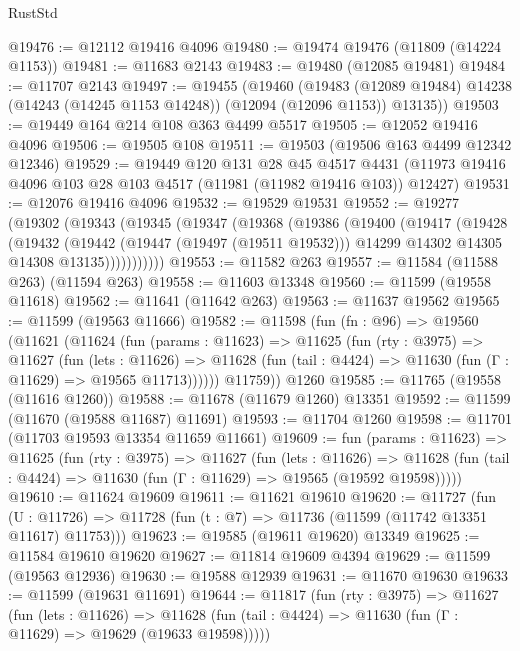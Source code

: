 \begin{lexlean}{RustStd}
\begin{coremodule}
@19476 := @12112 @19416 @4096
@19480 := @19474 @19476 (@11809 (@14224 @1153))
@19481 := @11683 @2143
@19483 := @19480 (@12085 @19481)
@19484 := @11707 @2143
@19497 := @19455
    (@19460
      (@19483 (@12089 @19484) @14238 (@14243 (@14245 @1153 @14248)) (@12094 (@12096 @1153)) @13135))
@19503 := @19449 @164 @214 @108 @363 @4499 @5517
@19505 := @12052 @19416 @4096
@19506 := @19505 @108
@19511 := @19503 (@19506 @163 @4499 @12342 @12346)
@19529 := @19449
    @120
    @131
    @28
    @45
    @4517
    @4431
    (@11973 @19416 @4096 @103 @28 @103 @4517 (@11981 (@11982 @19416 @103)) @12427)
@19531 := @12076 @19416 @4096
@19532 := @19529 @19531
@19552 := @19277
    (@19302
      (@19343
        (@19345
          (@19347
            (@19368
              (@19386
                (@19400
                  (@19417
                    (@19428
                      (@19432
                        (@19442
                          (@19447 (@19497 (@19511 @19532)))
                          @14299
                          @14302
                          @14305
                          @14308
                          @13135)))))))))))
@19553 := @11582 @263
@19557 := @11584 (@11588 @263) (@11594 @263)
@19558 := @11603 @13348
@19560 := @11599 (@19558 @11618)
@19562 := @11641 (@11642 @263)
@19563 := @11637 @19562
@19565 := @11599 (@19563 @11666)
@19582 := @11598
    (fun (fn : @96) =>
    @19560
      (@11621
        (@11624
          (fun (params : @11623) =>
          @11625
            (fun (rty : @3975) =>
            @11627
              (fun (lets : @11626) =>
              @11628 (fun (tail : @4424) => @11630 (fun (Γ : @11629) => @19565 @11713))))))
        @11759))
    @1260
@19585 := @11765 (@19558 (@11616 @1260))
@19588 := @11678 (@11679 @1260) @13351
@19592 := @11599 (@11670 (@19588 @11687) @11691)
@19593 := @11704 @1260
@19598 := @11701 (@11703 @19593 @13354 @11659 @11661)
@19609 := fun (params : @11623) =>
  @11625
    (fun (rty : @3975) =>
    @11627
      (fun (lets : @11626) =>
      @11628 (fun (tail : @4424) => @11630 (fun (Γ : @11629) => @19565 (@19592 @19598)))))
@19610 := @11624 @19609
@19611 := @11621 @19610
@19620 := @11727
    (fun (U : @11726) => @11728 (fun (t : @7) => @11736 (@11599 (@11742 @13351 @11617) @11753)))
@19623 := @19585 (@19611 @19620) @13349
@19625 := @11584 @19610 @19620
@19627 := @11814 @19609 @4394
@19629 := @11599 (@19563 @12936)
@19630 := @19588 @12939
@19631 := @11670 @19630
@19633 := @11599 (@19631 @11691)
@19644 := @11817
    (fun (rty : @3975) =>
    @11627
      (fun (lets : @11626) =>
      @11628 (fun (tail : @4424) => @11630 (fun (Γ : @11629) => @19629 (@19633 @19598)))))

\end{coremodule}
\end{lexlean}
